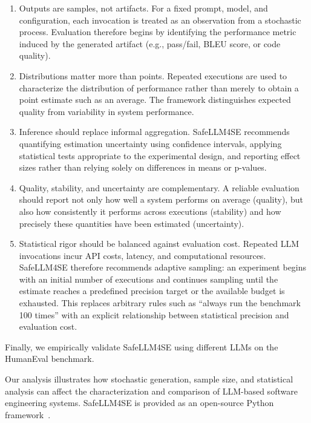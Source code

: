 \documentclass{IEEEcsmag}
\begin{document}
\begin{enumerate}

\item Outputs are samples, not artifacts. For a fixed prompt, model, and configuration, each invocation is treated as an observation from a stochastic process. Evaluation therefore begins by identifying the performance metric induced by the generated artifact (e.g., pass/fail, BLEU score, or code quality).

\item Distributions matter more than points. Repeated executions are used to characterize the distribution of performance rather than merely to obtain a point estimate such as an average. The framework distinguishes expected quality from variability in system performance.

\item Inference should replace informal aggregation. SafeLLM4SE recommends quantifying estimation uncertainty using confidence intervals, applying statistical tests appropriate to the experimental design, and reporting effect sizes rather than relying solely on differences in means or p-values.

\item Quality, stability, and uncertainty are complementary. A reliable evaluation should report not only how well a system performs on average (quality), but also how consistently it performs across executions (stability) and how precisely these quantities have been estimated (uncertainty).

\item Statistical rigor should be balanced against evaluation cost. Repeated LLM invocations incur API costs, latency, and computational resources. SafeLLM4SE therefore recommends adaptive sampling: an experiment begins with an initial number of executions and continues sampling until the estimate reaches a predefined precision target or the available budget is exhausted. This replaces arbitrary rules such as “always run the benchmark 100 times” with an explicit relationship between statistical precision and evaluation cost.
\end{enumerate}

Finally, we empirically validate SafeLLM4SE using different LLMs on the HumanEval benchmark. 

Our analysis illustrates how stochastic generation, sample size, and statistical analysis can affect the characterization and comparison of LLM-based software engineering systems. SafeLLM4SE is provided as an open-source Python framework~\cite{ref}.
\end{document}
